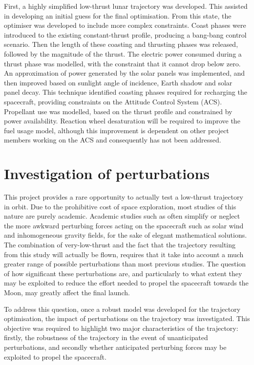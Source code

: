 First, a highly simplified low-thrust lunar trajectory was developed. This assisted in developing an initial guess for the final optimisation. From this state, the optimiser was developed to include more complex constraints. Coast phases were introduced to the existing constant-thrust profile, producing a bang-bang control scenario. Then the length of these coasting and thrusting phases was released, followed by the magnitude of the thrust. The electric power consumed during a thrust phase was modelled, with the constraint that it cannot drop below zero. An approximation of power generated by the solar panels was implemented, and then improved based on sunlight angle of incidence, Earth shadow and solar panel decay. This technique identified coasting phases required for recharging the spacecraft, providing constraints on the Attitude Control System (ACS). Propellant use was modelled, based on the thrust profile and constrained by power availability. Reaction wheel desaturation will be required to improve the fuel usage model, although this improvement is dependent on other project members working on the ACS and consequently has not been addressed.

\section{Investigation of perturbations} \label{sec:Perturbation-objective}

This project provides a rare opportunity to actually test a low-thrust trajectory in orbit. Due to the prohibitive cost of space exploration, most studies of this nature are purely academic. Academic studies such as \textcite{Betts2000} often simplify or neglect the more awkward perturbing forces acting on the spacecraft such as solar wind and inhomogeneous gravity fields, for the sake of elegant mathematical solutions. The combination of very-low-thrust and the fact that the trajectory resulting from this study will actually be flown, requires that it take into account a much greater range of possible perturbations than most previous studies. The question of how significant these perturbations are, and particularly to what extent they may be exploited to reduce the effort needed to propel the spacecraft towards the Moon, may greatly affect the final launch.

To address this question, once a robust model was developed for the trajectory optimisation, the impact of perturbations on the trajectory was investigated. This objective was required to highlight two major characteristics of the trajectory: firstly, the robustness of the trajectory in the event of unanticipated perturbations, and secondly whether anticipated perturbing forces may be exploited to propel the spacecraft.

